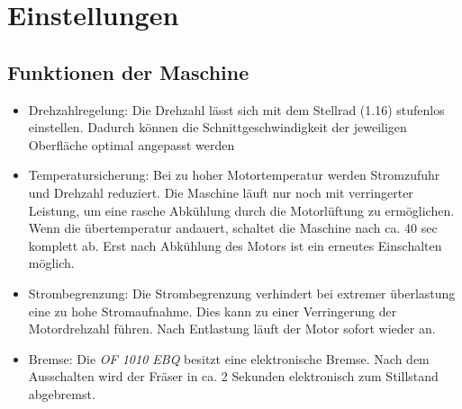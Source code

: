 \documentclass{\basedir/fablab-document}
\begin{document}
\section{Einstellungen}
\subsection{Funktionen der Maschine}
\begin{itemize}
\item Drehzahlregelung: Die Drehzahl lässt sich mit dem Stellrad (1.16) stufenlos einstellen. Dadurch können die Schnittgeschwindigkeit der jeweiligen Oberfläche optimal angepasst werden
\item Temperatursicherung: Bei zu hoher Motortemperatur werden Stromzufuhr und Drehzahl reduziert. Die Maschine läuft nur noch mit verringerter Leistung, um eine rasche Abkühlung durch die Motorlüftung zu ermöglichen. Wenn die übertemperatur andauert, schaltet die Maschine nach ca. 40 sec komplett ab. Erst nach Abkühlung des Motors ist ein erneutes Einschalten möglich.
\item Strombegrenzung: Die Strombegrenzung verhindert bei extremer überlastung eine zu hohe Stromaufnahme. Dies kann zu einer Verringerung der Motordrehzahl führen. Nach Entlastung läuft der Motor sofort wieder an.
\item Bremse: Die \textit{OF 1010 EBQ} besitzt eine elektronische Bremse. Nach dem Ausschalten wird der Fräser in ca. 2 Sekunden elektronisch zum Stillstand abgebremst.
\end{itemize}
\end{document}
